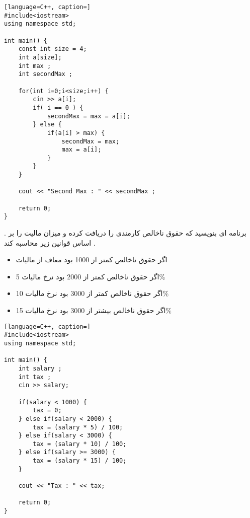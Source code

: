 \documentclass[12pt]{article}
\begin{document}
\begin{latin}
\begin{lstlisting}[language=C++, caption=]
#include<iostream>
using namespace std;

int main() {
	const int size = 4;
	int a[size];
	int max ;
	int secondMax ; 
	
	for(int i=0;i<size;i++) {
		cin >> a[i];
		if( i == 0 ) {
			secondMax = max = a[i];
		} else {
			if(a[i] > max) {
				secondMax = max;
				max = a[i];
			}
		}
	}
	
	cout << "Second Max : " << secondMax ;
	
	return 0;
}
\end{lstlisting}
\end{latin}








\newpage

 . برنامه ای بنویسید که حقوق ناخالص کارمندی را دریافت کرده و میزان مالیت را بر اساس قوانین زیر محاسبه کند .

\begin{itemize}
	\item اگر حقوق ناخالص کمتر از 1000 بود معاف از مالیات
	\item اگر حقوق ناخالص کمتر از 2000 بود نرخ مالیات
	 5\%
	\item اگر حقوق ناخالص کمتر از 3000 بود نرخ مالیات
	10\%
	\item اگر حقوق ناخالص بیشتر از 3000 بود نرخ مالیات
	15\%
\end{itemize}






\begin{latin}
\begin{lstlisting}[language=C++, caption=]
#include<iostream>
using namespace std;

int main() {
	int salary ;
	int tax ;
	cin >> salary;
	
	if(salary < 1000) {
		tax = 0;
	} else if(salary < 2000) {
		tax = (salary * 5) / 100;
	} else if(salary < 3000) {
		tax = (salary * 10) / 100;
	} else if(salary >= 3000) {
		tax = (salary * 15) / 100;
	}
	
	cout << "Tax : " << tax;
	
	return 0;
}
\end{lstlisting}
\end{latin}
\end{document}
